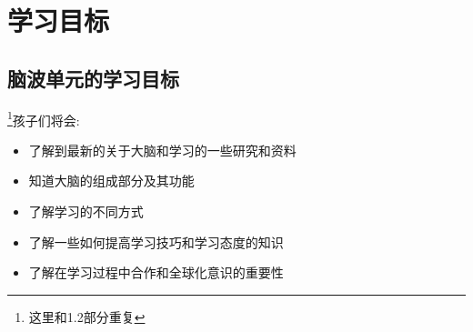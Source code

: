 \chapter{学习目标}


\section{脑波单元的学习目标}
\footnote{这里和1.2部分重复}孩子们将会:
      \begin{itemize}
        \item 了解到最新的关于大脑和学习的一些研究和资料 
        \item 知道大脑的组成部分及其功能
        \item 了解学习的不同方式  
        \item 了解一些如何提高学习技巧和学习态度的知识
        \item 了解在学习过程中合作和全球化意识的重要性
      \end{itemize}  
 
